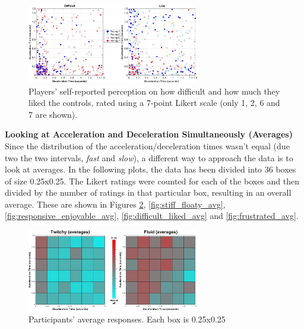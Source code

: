 \begin{figure}[htbp]
\centering
\includegraphics[width=0.67\textwidth]{Pics/Classes/difficult_like}
\caption{Players' self-reported perception on how difficult and how much they liked the controls, rated using a 7-point Likert scale (only 1, 2, 6 and 7 are shown).}
\label{fig:difficult_liked}
\end{figure}


\textbf{Looking at Acceleration and Deceleration Simultaneously (Averages)}\\
Since the distribution of the acceleration/deceleration times wasn't equal (due two the two intervals, \textit{fast} and \textit{slow}), a different way to approach the data is to look at averages. In the following plots, the data has been divided into 36 boxes of size 0.25x0.25. The Likert ratings were counted for each of the boxes and then divided by the number of ratings in that particular box, resulting in an overall average. These are shown in Figures \ref{fig:twitchyFluid_avg}, \ref{fig:stiff_floaty_avg}, \ref{fig:responsive_enjoyable_avg}, \ref{fig:difficult_liked_avg} and \ref{fig:frustrated_avg}.

\begin{figure}[htbp]
\centering
\includegraphics[width=0.67\textwidth]{Pics/Classes/averages/twitchy_fluid_avg}
\caption{Participants' average responses. Each box is 0.25x0.25}
\label{fig:twitchyFluid_avg}
\end{figure}

